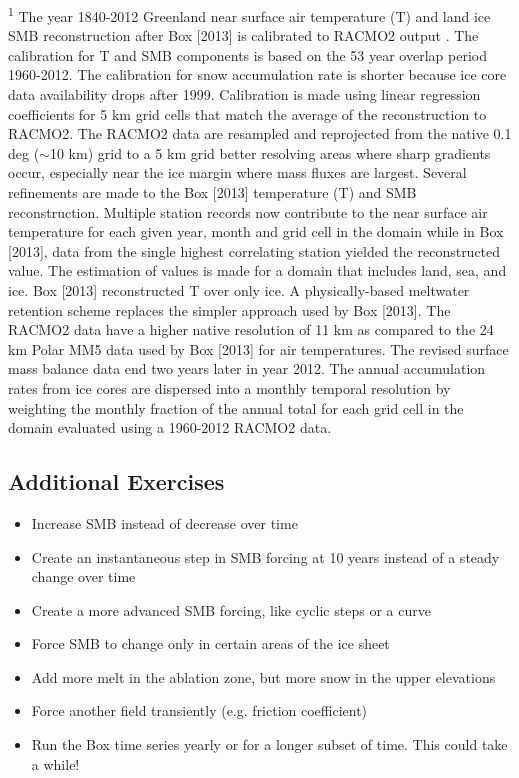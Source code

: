 \textsuperscript{1} \small{The year 1840-2012 Greenland near surface air temperature (T) and land ice SMB reconstruction after Box [2013] is calibrated to RACMO2 output \citep{Meijgaard2008,Ettema2009,Broeke2009,Angelen2011}. The calibration for T and SMB components is based on the 53 year overlap period 1960-2012. The calibration for snow accumulation rate is shorter because ice core data availability drops after 1999. Calibration is made using linear regression coefficients for 5 km grid cells that match the average of the reconstruction to RACMO2. The RACMO2 data are resampled and reprojected from the native 0.1 deg ($\sim$10 km) grid to a 5 km grid better resolving areas where sharp gradients occur, especially near the ice margin where mass fluxes are largest. Several refinements are made to the Box [2013] temperature (T) and SMB reconstruction. Multiple station records now contribute to the near surface air temperature for each given year, month and grid cell in the domain while in Box [2013], data from the single highest correlating station yielded the reconstructed value. The estimation of values is made for a domain that includes land, sea, and ice. Box [2013] reconstructed T over only ice. A physically-based meltwater retention scheme \citep{Pfeffer1990,Pfeffer1991} replaces the simpler approach used by Box [2013]. The RACMO2 data have a higher native resolution of 11 km as compared to the 24 km Polar MM5 data used by Box [2013] for air temperatures. The revised surface mass balance data end two years later in year 2012. The annual accumulation rates from ice cores are dispersed into a monthly temporal resolution by weighting the monthly fraction of the annual total for each grid cell in the domain evaluated using a 1960-2012 RACMO2 data.}
\subsection{Additional Exercises} %
\begin{itemize}
	\item Increase SMB instead of decrease over time
	\item Create an instantaneous step in SMB forcing at 10 years instead of a steady change over time
	\item Create a more advanced SMB forcing, like cyclic steps or a curve
	\item Force SMB to change only in certain areas of the ice sheet
	\item Add more melt in the ablation zone, but more snow in the upper elevations
	\item Force another field transiently (e.g. friction coefficient)
	\item Run the Box time series yearly or for a longer subset of time. This could take a while!
\end{itemize}
